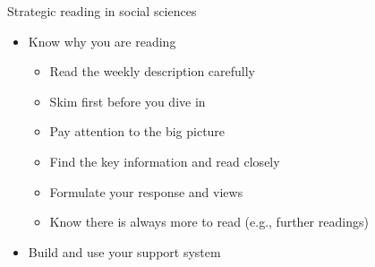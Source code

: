 \documentclass[
  10pt,
  ignorenonframetext,
]{beamer}
\begin{document}
\begin{frame}{Strategic reading in social sciences}
\protect\hypertarget{strategic-reading-in-social-sciences}{}
\begin{itemize}
  \item Know why you are reading
  \vspace{0.1cm}
  \begin{itemize}
    \item Read the weekly description carefully
    \item Skim first before you dive in
    \item Pay attention to the big picture
    \item Find the key information and read closely
    \item Formulate your response and views
    \item Know there is always more to read (e.g., further readings)
  \end{itemize}
  \vspace{0.5cm}
  \item Build and use your support system
\end{itemize}
\end{frame}
\end{document}
